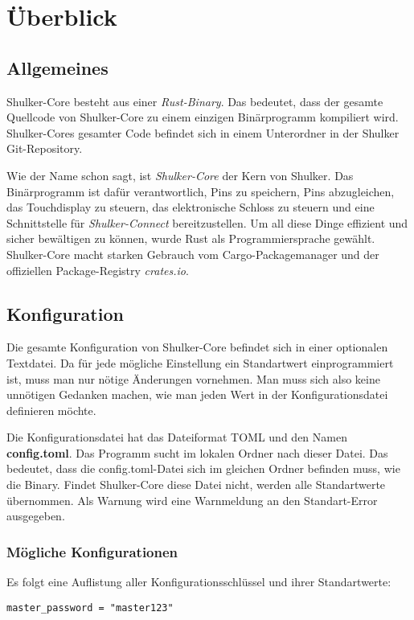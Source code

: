 \lstset{language=rust}
\chapter{Überblick}
\section{Allgemeines}
Shulker-Core besteht aus einer \textit{Rust-Binary}. Das bedeutet, dass der gesamte Quellcode von Shulker-Core zu einem einzigen
Binärprogramm kompiliert wird. Shulker-Cores gesamter Code befindet sich in einem Unterordner in der Shulker Git-Repository.

Wie der Name schon sagt, ist \textit{Shulker-Core} der Kern von Shulker. Das Binärprogramm ist dafür verantwortlich,
Pins zu speichern, Pins abzugleichen, das Touchdisplay zu steuern, das elektronische Schloss zu steuern und eine Schnittstelle
für \textit{Shulker-Connect} bereitzustellen. Um all diese Dinge effizient und sicher bewältigen zu können, wurde Rust als
Programmiersprache gewählt. Shulker-Core macht starken Gebrauch vom Cargo-Packagemanager und der offiziellen Package-Registry \textit{crates.io}.

\section{Konfiguration}
Die gesamte Konfiguration von Shulker-Core befindet sich in einer optionalen Textdatei. Da für jede mögliche Einstellung ein
Standartwert einprogrammiert ist, muss man nur nötige Änderungen vornehmen. Man muss sich also keine unnötigen Gedanken machen,
wie man jeden Wert in der Konfigurationsdatei definieren möchte.

Die Konfigurationsdatei hat das Dateiformat TOML und den Namen \textbf{config.toml}. Das Programm sucht im lokalen Ordner
nach dieser Datei. Das bedeutet, dass die config.toml-Datei sich im gleichen Ordner befinden muss, wie die Binary. Findet
Shulker-Core diese Datei nicht, werden alle Standartwerte übernommen. Als Warnung wird eine 
Warnmeldung an den Standart-Error ausgegeben.

\subsection{Mögliche Konfigurationen}
Es folgt eine Auflistung aller Konfigurationsschlüssel und ihrer Standartwerte:

\lstinline{master_password = "master123"}

